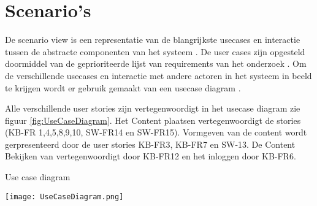 \section{Scenario's}
De scenario view is een representatie van de blangrijkste usecases en interactie tussen de abstracte componenten van het systeem \parencite{4+1ViewModelPaper}.
De user cases zijn opgesteld doormiddel van de geprioriteerde lijst van requirements van het onderzoek \parencite{DanteOnderzoek}.
Om de verschillende usecases en interactie met andere actoren in het systeem in beeld te krijgen wordt er gebruik gemaakt van een usecase diagram \parencite{UseCaseDiagram}.

\whitespace
Alle verschillende user stories zijn vertegenwoordigt in het usecase diagram zie figuur \ref{fig:UseCaseDiagram}.
Het Content plaatsen vertegenwoordigt de stories (KB-FR 1,4,5,8,9,10, SW-FR14 en SW-FR15).
Vormgeven van de content wordt gerpresenteerd door de user stories KB-FR3, KB-FR7 en SW-13.
De Content Bekijken van vertegenwoordigt door KB-FR12 en het inloggen door KB-FR6.

\whitespace[2]
\begin{graphic}
	\captionsetup{type=figure}
	\caption{Use case diagram}
	\texttt{[image: UseCaseDiagram.png]}
	\label{fig:UseCaseDiagram}
\end{graphic}

